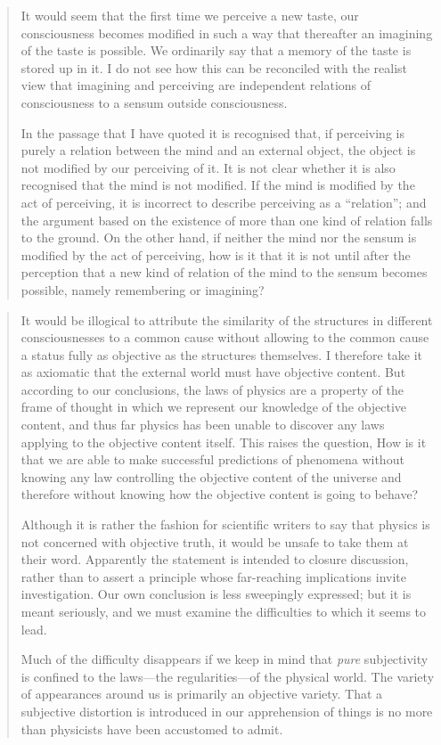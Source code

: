 \begin{quote}
    It would seem that the first time we perceive a new taste, our consciousness becomes modified in such a way that thereafter an imagining of the taste is possible.  We ordinarily say that a memory of the taste is stored up in it.  I do not see how this can be reconciled with the realist view that imagining and perceiving are independent relations of consciousness to a sensum outside consciousness.  
    
    In the passage that I have quoted it is recognised that, if perceiving is purely a relation between the mind and an external object, the object is not modified by our perceiving of it.  It is not clear whether it is also recognised that the mind is not modified.  If the mind is modified by the act of perceiving, it is incorrect to describe perceiving as a ``relation''; and the argument based on the existence of more than one kind of relation falls to the ground.  On the other hand, if neither the mind nor the sensum is modified by the act of perceiving, how is it that it is not until after the perception that a new kind of relation of the mind to the sensum becomes possible, namely remembering or imagining?  \citep[p. 215]{Eddington1939}
\end{quote}

\begin{quote}
    It would be illogical to attribute the similarity of the structures in different consciousnesses to a common cause without allowing to the common cause a status fully as objective as the structures themselves.  I therefore take it as axiomatic that the external world must have objective content.  But according to our conclusions, the laws of physics are a property of the frame of thought in which we represent our knowledge of the objective content, and thus far physics has been unable to discover any laws applying to the objective content itself.  This raises the question, How is it that we are able to make successful predictions of phenomena without knowing any law controlling the objective content of the universe and therefore without knowing how the objective content is going to behave?

    Although it is rather the fashion for scientific writers to say that physics is not concerned with objective truth, it would be unsafe to take them at their word.  Apparently the statement is intended to closure discussion, rather than to assert a principle whose far-reaching implications invite investigation.  Our own conclusion is less sweepingly expressed; but it is meant seriously, and we must examine the difficulties to which it seems to lead.  

    Much of the difficulty disappears if we keep in mind that \emph{pure} subjectivity is confined to the laws---the regularities---of the physical world.  The variety of appearances around us is primarily an objective variety.  That a subjective distortion is introduced in our apprehension of things is no more than physicists have been accustomed to admit.  \citep[p. 217]{Eddington1939}
\end{quote}


